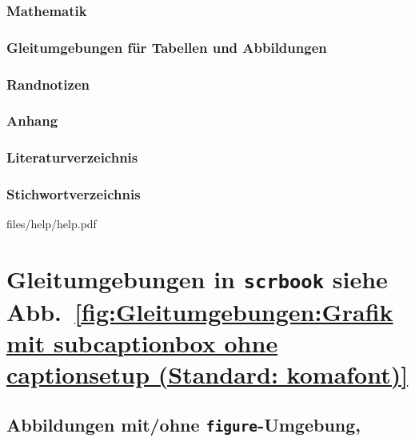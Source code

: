 \section{Mathematik}
\label{sec:Einfuehrung:Hauptklassen:Mathematik}
\lipsum[1-1]
\section{Gleitumgebungen für Tabellen und Abbildungen}
\label{sec:Einfuehrung:Hauptklassen:Gleitumgebungen}
\lipsum[1-1]
\section{Randnotizen}
\label{sec:Einfuehrung:Hauptklassen:Randnotizen}
\lipsum[1-1]
\section{Anhang}
\label{sec:Einfuehrung:Hauptklassen:Anhang}
\lipsum[1-1]
\section{Literaturverzeichnis}
\label{sec:Einfuehrung:Hauptklassen:Literaturverzeichnis}
\lipsum[1-1]
\section{Stichwortverzeichnis}
\label{sec:Einfuehrung:Hauptklassen:Stichwortverzeichnis}
\lipsum[1-1]

\clearpage{}%
	{files/help/help.pdf}%
\clearpage\TUMStandardAreaMain%

\part{Gleitumgebungen in \texttt{scrbook}\texorpdfstring{ siehe Abb.~\ref{fig:Gleitumgebungen:Grafik mit subcaptionbox ohne captionsetup (Standard: komafont)}}{}}
\label{part:Gleitumgebungen in scrbook}
\chapter{Abbildungen mit/ohne \texttt{figure}-Umgebung\texorpdfstring{, \cite{LabenbacherTeX}}{}}
\label{chap:Gleitumgebungen:Abbildungen figure-Umgebung}

